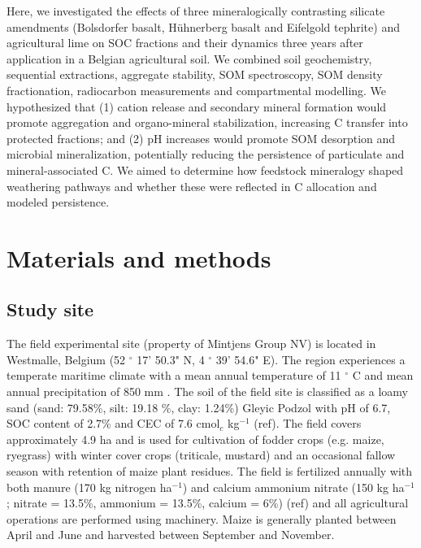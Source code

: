 \documentclass[preprint,12pt]{elsarticle}
\begin{document}
Here, we investigated the effects of three mineralogically contrasting silicate amendments (Bolsdorfer basalt, H\"uhnerberg basalt and Eifelgold tephrite) and agricultural lime on SOC fractions and their dynamics three years after application in a Belgian agricultural soil. We combined soil geochemistry, sequential extractions, aggregate stability, SOM spectroscopy, SOM density fractionation, radiocarbon measurements and compartmental modelling. We hypothesized that (1) cation release and secondary mineral formation would promote aggregation and organo-mineral stabilization, increasing C transfer into protected fractions; and (2) pH increases would promote SOM desorption and microbial mineralization, potentially reducing the persistence of particulate and mineral-associated C. We aimed to determine how feedstock mineralogy shaped weathering pathways and whether these were reflected in C allocation and modeled persistence.

\section{Materials and methods}
\label{sec:methods}

\subsection{Study site}
\label{subsec:study_site}

The field experimental site (property of Mintjens Group NV) is located in Westmalle, Belgium (52 $^\circ$ 17' 50.3" N, 4 $^\circ$ 39' 54.6" E). The region experiences a temperate maritime climate with a mean annual temperature of 11 $^\circ$ C and mean annual precipitation of 850 mm \citep{Meteovista}. The soil of the field site is classified as a loamy sand (sand: 79.58\%, silt: 19.18 \%, clay: 1.24\%) Gleyic Podzol \citep{WorldReferenceBaseforSoilResources2014} with pH of 6.7, SOC content of 2.7\% and CEC of 7.6 cmol$_c$ kg$^{-1}$ (ref). The field covers approximately 4.9 ha and is used for cultivation of fodder crops (e.g. maize, ryegrass) with winter cover crops (triticale, mustard) and an occasional fallow season with retention of maize plant residues. The field is fertilized annually with both manure (170 kg nitrogen ha$^{-1}$) and calcium ammonium nitrate (150 kg ha$^{-1}$; nitrate = 13.5\%, ammonium = 13.5\%, calcium = 6\%) (ref) and all agricultural operations are performed using machinery. Maize is generally planted between April and June and harvested between September and November. 
\end{document}
